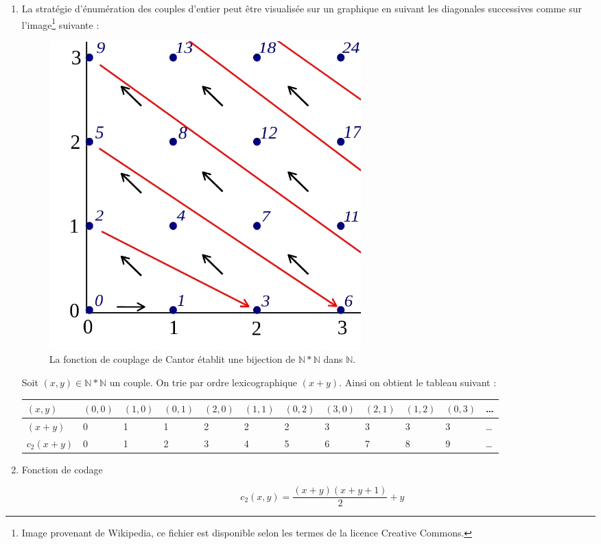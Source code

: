 \begin{enumerate}
\item La stratégie d'énumération des couples d'entier peut être visualisée sur un graphique en suivant les diagonales successives comme sur l'image\footnote{Image provenant de Wikipedia, ce fichier est disponible selon les termes de la licence
 Creative Commons.} suivante :
\begin{figure}[!h]
\begin{center}
\includegraphics[width=0.6\textwidth]{files/diagcouples.pdf}
\caption{La fonction de couplage de Cantor établit une bijection de $\mathbb{N}*\mathbb{N}$ dans
 $\mathbb{N}$.}
 \end{center}
\end{figure}

Soit $(x,y) \in \mathbb{N}*\mathbb{N}$ un couple. On trie par ordre lexicographique $(x+y)$. Ainsi on obtient le tableau suivant :

\begin{tabularx}{1.1\textwidth}{| m{1.5cm} | X | X | X | X | X | X | X | X | X | X | X }
\hline
$(x,y)$ & $(0,0)$ & $(1,0)$ & $(0,1)$ & $(2,0)$ & $(1,1)$ & $(0,2)$ & $(3,0)$ & $(2,1)$ & $(1,2)$ & $(0,3)$ & \ldots \\
\hline
$(x+y)$ & 0 & 1 & 1 & 2 & 2 & 2 & 3 & 3 & 3 & 3 & \ldots \\
\hline
$c_2(x+y)$ & 0 & 1 & 2 & 3 & 4 & 5 & 6 & 7 & 8 & 9 & \ldots \\
\hline
\end{tabularx}

\item
\begin{description}
\item[Fonction de codage]
\[ c_2(x,y)= \frac{(x+y)(x+y+1)}{2}+y \]


\end{description}
\end{enumerate}
